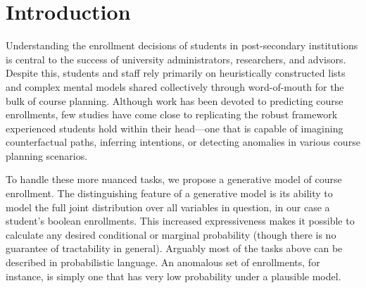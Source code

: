 \documentclass{edm_template}
\begin{document}

\maketitle
\begin{abstract}

\end{abstract}

%


\section{Introduction}

Understanding the enrollment decisions of students in post-secondary institutions is central to the success of university administrators, researchers, and advisors. Despite this, students and staff rely primarily on heuristically constructed lists and complex mental models shared collectively through word-of-mouth for the bulk of course planning. Although work has been devoted to predicting course enrollments, few studies have come close to replicating the robust framework experienced students hold within their head---one that is capable of imagining counterfactual paths, inferring intentions, or detecting anomalies in various course planning scenarios.

To handle these more nuanced tasks, we propose a generative model of course enrollment. The distinguishing feature of a generative model is its ability to model the full joint distribution over all variables in question, in our case a student's boolean enrollments. This increased expressiveness makes it possible to calculate any desired conditional or marginal probability (though there is no guarantee of tractability in general). Arguably most of the tasks above can be described in probabilistic language. An anomalous set of enrollments, for instance, is simply one that has very low probability under a plausible model.
\end{document}

